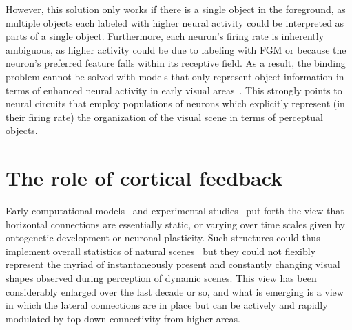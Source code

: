 However, this solution only works if there is a single object in the foreground, as multiple objects each labeled with higher neural activity could be interpreted as parts of a single object. Furthermore, each neuron's firing rate is inherently ambiguous, as higher activity could be due to labeling with FGM or because the neuron's preferred feature falls within its receptive field. As a result, the binding problem cannot be solved with models that only represent object information in terms of enhanced neural activity in early visual areas~\citep{Niebur00a}. This strongly points to neural circuits that employ populations of neurons which explicitly represent (\ie in their firing rate) the organization of the visual scene in terms of perceptual objects.

\section{The role of cortical feedback}

%
Early computational models~\citep{Stemmler_etal95b} and experimental studies~\citep{Simonotto_etal97,Polat_etal98,Chatterjee_etal11,Xie_etal14} put forth the view that horizontal connections
are essentially static, or varying over time scales given by ontogenetic development or neuronal plasticity. Such structures could thus implement overall statistics of natural scenes~\citep[like circular structures, e.g.][]{Sigman_etal01} but they could not flexibly represent the myriad of instantaneously present and constantly changing visual shapes observed during perception of dynamic scenes. This view has been considerably enlarged over the last decade or so, and what is emerging is a view in which the lateral connections are in place but can be actively and rapidly modulated by top-down connectivity from higher areas.

